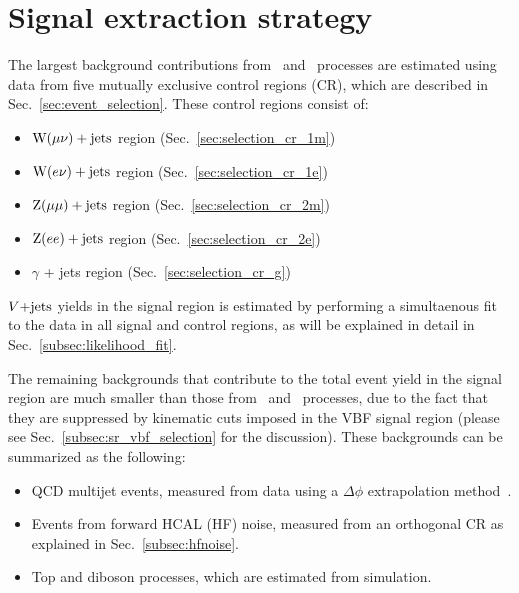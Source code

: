 \section{Signal extraction strategy}
\label{sec:signal_extraction}

\newcommand\tfPlotDir{TransferFactors/merged_2023-04-08_vbfhinv_full_analysis_NLO_VJets_09Apr23_thesis_v1}

The largest background contributions from \Zvvjets~and \Wlvjets~processes
are estimated using data from five mutually exclusive control regions (CR), which are described in
Sec.~\ref{sec:event_selection}. These control regions consist of:

\begin{itemize}
  \item $\mathrm{W}(\mu\nu)+\textrm{jets}$ region (Sec.~\ref{sec:selection_cr_1m})
  \item $\mathrm{W}(e\nu)+\textrm{jets}$ region (Sec.~\ref{sec:selection_cr_1e})
  \item $\mathrm{Z}(\mu\mu)+\textrm{jets}$ region (Sec.~\ref{sec:selection_cr_2m})
  \item $\mathrm{Z}(ee)+\textrm{jets}$ region (Sec.~\ref{sec:selection_cr_2e})
  \item $\gamma$ + jets region (Sec.~\ref{sec:selection_cr_g})
\end{itemize}

$V\text{+jets}$ yields in the signal region is estimated by performing a simultaenous fit to the data 
in all signal and control regions, as will be explained in detail in Sec.~\ref{subsec:likelihood_fit}.

The remaining backgrounds that contribute to the total event yield in the signal region
are much smaller than those from \Zvvjets~and \Wlvjets~processes, due to the fact that they are
suppressed by kinematic cuts imposed in the VBF signal region (please see Sec.~\ref{subsec:sr_vbf_selection} for the discussion). 
These backgrounds can be summarized as the following: 

\begin{itemize}
    \item QCD multijet events, measured from data using a $\Delta\phi$ extrapolation method~\cite{VBFHinvAnalysisPaper}.
    \item Events from forward HCAL (HF) noise, measured from an orthogonal CR as explained in Sec.~\ref{subsec:hfnoise}.
    \item Top and diboson processes, which are estimated from simulation.
\end{itemize}

